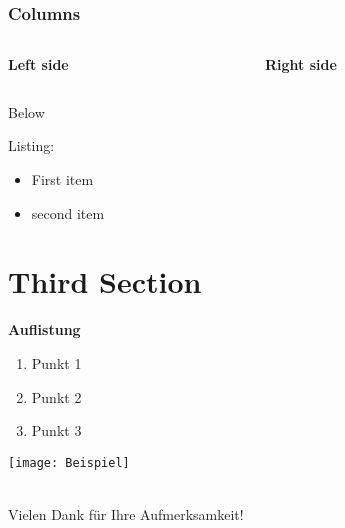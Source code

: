 \documentclass{beamer}
\begin{document}
\begin{frame}
\frametitle{Columns}
\begin{columns}	
	\begin{column}[c]{0.6\textwidth}

		\Large\textbf{Left side}\\
	
	\end{column}

	\begin{column}[c]{0.4\textwidth}

		\Large\textbf{Right side}\\
		
	\end{column}
\end{columns}
\vspace{1.5cm}
Below

Listing:
\begin{itemize}
	\item First item
	\item second item
\end{itemize}
\end{frame}



\section{Third Section}

\begin{frame}
	\begin{minipage}{0.45\textwidth}
	\textbf{Auflistung}
	\begin{enumerate}
		\item Punkt 1
		\item Punkt 2
		\item Punkt 3
	\end{enumerate}
\end{minipage}	
\hfill
\begin{minipage}{0.49\textwidth}
	\texttt{[image: Beispiel]}
\end{minipage}
\end{frame}




\begin{frame}[plain]
\centering
\hfill
\hfill\\


\centering
\huge Vielen Dank für Ihre Aufmerksamkeit!
\end{frame}
\end{document}

